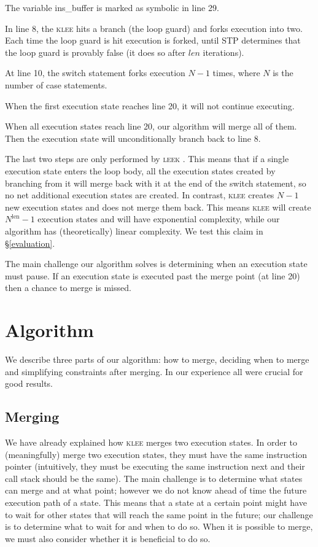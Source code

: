 \documentclass[12pt,a4paper]{article}
\newcommand{\klee}{\textsc{klee }}
\newcommand{\leek}{\textsc{leek }}
\begin{document}
\begin{enumerate*}
\item The variable ins\_buffer is marked as symbolic in line 29.
\item In line 8, the \klee hits a branch (the loop guard) and forks execution into two. Each time the loop guard is hit execution is forked, until STP determines that the loop guard is provably false (it does so after $len$ iterations).
\item At line 10, the switch statement forks execution $N-1$ times, where $N$ is the number of case statements.
\item When the first execution state reaches line 20, it will not continue executing.
\item When all execution states reach line 20, our algorithm will merge all of them. Then the execution state will unconditionally branch back to line 8.
\end{enumerate*}

The last two steps are only performed by \leek. This means that if a single execution state enters the loop body, all the execution states created by branching from it will merge back with it at the end of the switch statement, so no net additional execution states are created. In contrast, \klee creates $N-1$ new execution states and does not merge them back. This means \klee will create $N^\text{len} - 1$ execution states and will have exponential complexity, while our algorithm has (theoretically) linear complexity. We test this claim in \S\ref{evaluation}.

The main challenge our algorithm solves is determining when an execution state must pause. If an execution state is executed past the merge point (at line 20) then a chance to merge is missed.

\section*{Algorithm}\label{algorithm}
We describe three parts of our algorithm: how to merge, deciding when to merge and simplifying constraints after merging. In our experience all were crucial for good results.

\subsection*{Merging}

We have already explained how \klee merges two execution states. In order to (meaningfully) merge two execution states, they must have the same instruction pointer (intuitively, they must be executing the same instruction next and their call stack should be the same). The main challenge is to determine what states can merge and at what point; however we do not know ahead of time the future execution path of a state. This means that a state at a certain point might have to wait for other states that will reach the same point in the future; our challenge is to determine what to wait for and when to do so. When it is possible to merge, we must also consider whether it is beneficial to do so.
\end{document}
